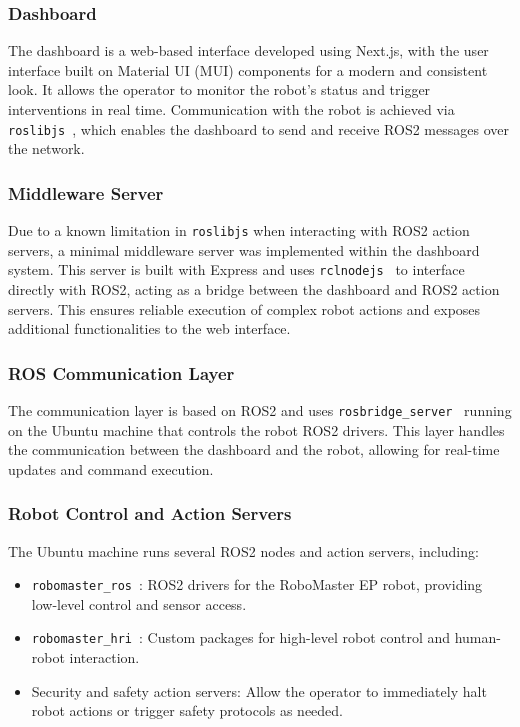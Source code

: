 \documentclass[a4paper]{usiinfbachelorproject}
\begin{document}
\subsubsection*{\textbf{Dashboard}}
The dashboard is a web-based interface developed using Next.js, with the user interface built on Material UI (MUI) components for a modern and consistent look.
It allows the operator to monitor the robot's status and trigger interventions in real time. Communication with the robot is achieved via \texttt{roslibjs}~\cite{roslibjs}, which enables the dashboard to send and receive ROS2 messages over the network.

\subsubsection*{\textbf{Middleware Server}}
Due to a known limitation in \texttt{roslibjs} when interacting with ROS2 action servers, a minimal middleware server was implemented within the dashboard system.
This server is built with Express and uses \texttt{rclnodejs}~\cite{rclnodejs} to interface directly with ROS2, acting as a bridge between the dashboard and ROS2 action servers.
This ensures reliable execution of complex robot actions and exposes additional functionalities to the web interface.

\subsubsection*{\textbf{ROS Communication Layer}}
The communication layer is based on ROS2 and uses \texttt{rosbridge\_server}~\cite{rosbridge} running on the Ubuntu machine that controls the robot ROS2 drivers.
This layer handles the communication between the dashboard and the robot, allowing for real-time updates and command execution.

\subsubsection*{\textbf{Robot Control and Action Servers}}
The Ubuntu machine runs several ROS2 nodes and action servers, including:
\begin{itemize}
    \item \texttt{robomaster\_ros}~\cite{frovaaa2025robomaster}: ROS2 drivers for the RoboMaster EP robot, providing low-level control and sensor access.
    \item \texttt{robomaster\_hri}~\cite{frovaaa2025robomasterhri}: Custom packages for high-level robot control and human-robot interaction.
    \item Security and safety action servers: Allow the operator to immediately halt robot actions or trigger safety protocols as needed.
\end{itemize}
\end{document}
